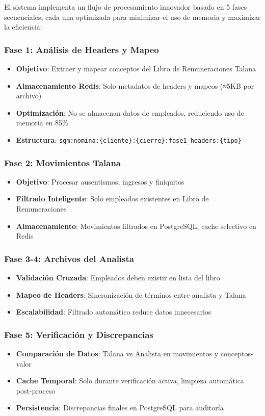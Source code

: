 El sistema implementa un flujo de procesamiento innovador basado en 5 fases secuenciales, cada una optimizada para minimizar el uso de memoria y maximizar la eficiencia:

\subsubsection{Fase 1: Análisis de Headers y Mapeo}
\begin{itemize}
    \item \textbf{Objetivo}: Extraer y mapear conceptos del Libro de Remuneraciones Talana
    \item \textbf{Almacenamiento Redis}: Solo metadatos de headers y mapeos (≈5KB por archivo)
    \item \textbf{Optimización}: No se almacenan datos de empleados, reduciendo uso de memoria en 85\%
    \item \textbf{Estructura}: \texttt{sgm:nomina:\{cliente\}:\{cierre\}:fase1\_headers:\{tipo\}}
\end{itemize}

\subsubsection{Fase 2: Movimientos Talana}
\begin{itemize}
    \item \textbf{Objetivo}: Procesar ausentismos, ingresos y finiquitos
    \item \textbf{Filtrado Inteligente}: Solo empleados existentes en Libro de Remuneraciones
    \item \textbf{Almacenamiento}: Movimientos filtrados en PostgreSQL, cache selectivo en Redis
\end{itemize}

\subsubsection{Fase 3-4: Archivos del Analista}
\begin{itemize}
    \item \textbf{Validación Cruzada}: Empleados deben existir en lista del libro
    \item \textbf{Mapeo de Headers}: Sincronización de términos entre analista y Talana
    \item \textbf{Escalabilidad}: Filtrado automático reduce datos innecesarios
\end{itemize}

\subsubsection{Fase 5: Verificación y Discrepancias}
\begin{itemize}
    \item \textbf{Comparación de Datos}: Talana vs Analista en movimientos y conceptos-valor
    \item \textbf{Cache Temporal}: Solo durante verificación activa, limpieza automática post-proceso
    \item \textbf{Persistencia}: Discrepancias finales en PostgreSQL para auditoría
\end{itemize}

